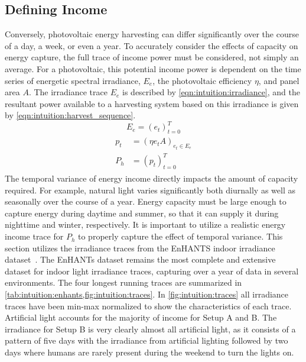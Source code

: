 \subsection{Defining Income}
Conversely, photovoltaic energy harvesting can differ significantly over the course of a day, a week, or even a year. 
To accurately consider the effects of capacity on energy capture, the full trace of income power must be considered, not simply an average.
For a photovoltaic, this potential income power is dependent on the time series of energetic spectral irradiance, $E_e$, the photovoltaic efficiency $\eta$, and panel area $A$.
The irradiance trace $E_e$ is described by \cref{eqn:intuition:irradiance}, and the resultant power available to a harvesting system based on this irradiance is given by \cref{eqn:intuition:harvest_sequence}.
\begin{equation}
    \label{eqn:intuition:irradiance}
    E_e = (e_t) ^ {T}_{t=0}
\end{equation}
\begin{align} 
    \begin{split}
    p_t & = (\eta e_{t} A)_{e_t \in E_e}\\
    P_{h} &= (p_t) ^T _{t=0}
    \end{split}
    \label{eqn:intuition:harvest_sequence}
\end{align}
The temporal variance of energy income directly impacts the amount of capacity required. 
For example, natural light varies significantly both diurnally as well as seasonally over the course of a year.
Energy capacity must be large enough to capture energy during daytime and summer, so that it can supply it during nighttime and winter, respectively. 
It is important to utilize a realistic energy income trace for $P_h$ to properly capture the effect of temporal variance.
This section utilizes the irradiance traces from the EnHANTS indoor irradiance dataset~\cite{gorlatova2013networking}.
The EnHANTs dataset remains the most complete and extensive dataset for indoor light
irradiance traces, capturing over a year of data in several environments.
The four longest running traces are summarized in \cref{tab:intuition:enhants,fig:intuition:traces}.
In \cref{fig:intuition:traces} all irradiance traces have been min-max normalized to show the characteristics of each trace.
Artificial light accounts for the majority of income for Setup A and B.
The irradiance for Setup B is very clearly almost all artificial light, as it consists of a pattern of five days with the irradiance from artificial lighting followed by two days where humans are rarely present during the weekend to turn the lights on. 
